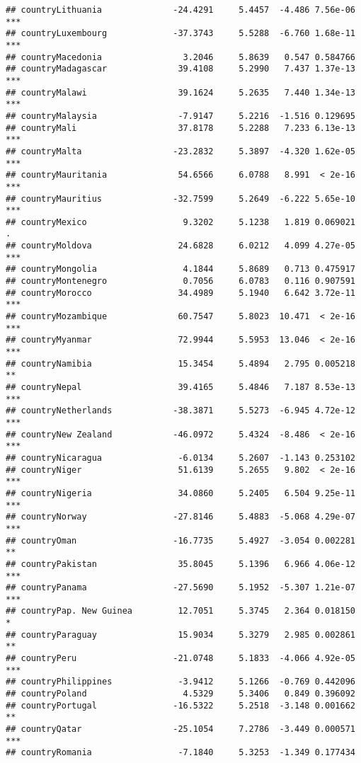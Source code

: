 \documentclass[
  11pt,
]{article}
\begin{document}
\begin{verbatim}
## countryLithuania              -24.4291     5.4457  -4.486 7.56e-06 ***
## countryLuxembourg             -37.3743     5.5288  -6.760 1.68e-11 ***
## countryMacedonia                3.2046     5.8639   0.547 0.584766    
## countryMadagascar              39.4108     5.2990   7.437 1.37e-13 ***
## countryMalawi                  39.1624     5.2635   7.440 1.34e-13 ***
## countryMalaysia                -7.9147     5.2216  -1.516 0.129695    
## countryMali                    37.8178     5.2288   7.233 6.13e-13 ***
## countryMalta                  -23.2832     5.3897  -4.320 1.62e-05 ***
## countryMauritania              54.6566     6.0788   8.991  < 2e-16 ***
## countryMauritius              -32.7599     5.2649  -6.222 5.65e-10 ***
## countryMexico                   9.3202     5.1238   1.819 0.069021 .  
## countryMoldova                 24.6828     6.0212   4.099 4.27e-05 ***
## countryMongolia                 4.1844     5.8689   0.713 0.475917    
## countryMontenegro               0.7056     6.0783   0.116 0.907591    
## countryMorocco                 34.4989     5.1940   6.642 3.72e-11 ***
## countryMozambique              60.7547     5.8023  10.471  < 2e-16 ***
## countryMyanmar                 72.9944     5.5953  13.046  < 2e-16 ***
## countryNamibia                 15.3454     5.4894   2.795 0.005218 ** 
## countryNepal                   39.4165     5.4846   7.187 8.53e-13 ***
## countryNetherlands            -38.3871     5.5273  -6.945 4.72e-12 ***
## countryNew Zealand            -46.0972     5.4324  -8.486  < 2e-16 ***
## countryNicaragua               -6.0134     5.2607  -1.143 0.253102    
## countryNiger                   51.6139     5.2655   9.802  < 2e-16 ***
## countryNigeria                 34.0860     5.2405   6.504 9.25e-11 ***
## countryNorway                 -27.8146     5.4883  -5.068 4.29e-07 ***
## countryOman                   -16.7735     5.4927  -3.054 0.002281 ** 
## countryPakistan                35.8045     5.1396   6.966 4.06e-12 ***
## countryPanama                 -27.5690     5.1952  -5.307 1.21e-07 ***
## countryPap. New Guinea         12.7051     5.3745   2.364 0.018150 *  
## countryParaguay                15.9034     5.3279   2.985 0.002861 ** 
## countryPeru                   -21.0748     5.1833  -4.066 4.92e-05 ***
## countryPhilippines             -3.9412     5.1266  -0.769 0.442096    
## countryPoland                   4.5329     5.3406   0.849 0.396092    
## countryPortugal               -16.5322     5.2518  -3.148 0.001662 ** 
## countryQatar                  -25.1054     7.2786  -3.449 0.000571 ***
## countryRomania                 -7.1840     5.3253  -1.349 0.177434    

\end{verbatim}
\end{document}
